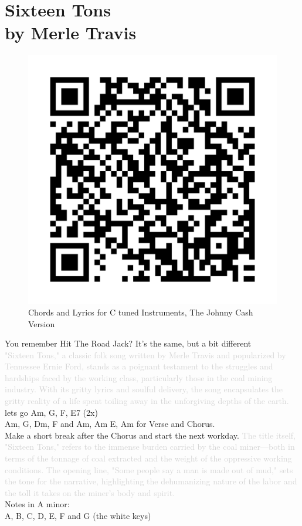 \chapter[Sixteen Tons]{Sixteen Tons\\[1ex]\large{by Merle Travis}}

\begin{figure}
\includegraphics[width=1\linewidth]{QR_Codes/QR_SixteenTons_Chords.png}\\
Chords and Lyrics for C tuned Instruments, The Johnny Cash Version
\end{figure}

You remember Hit The Road Jack? It's the same, but a bit different\\
\textcolor{lightgray}{"Sixteen Tons," a classic folk song written by Merle Travis and popularized by Tennessee Ernie Ford, stands as a poignant testament to the struggles and hardships faced by the working class, particularly those in the coal mining industry. With its gritty lyrics and soulful delivery, the song encapsulates the gritty reality of a life spent toiling away in the unforgiving depths of the earth.}\\ lets go Am, G, F, E7 (2x)\\ Am, G, Dm, F and Am, Am E, Am for Verse and Chorus.\\ Make a short break after the Chorus and start the next workday.
\textcolor{lightgray}{The title itself, "Sixteen Tons," refers to the immense burden carried by the coal miner—both in terms of the tonnage of coal extracted and the weight of the oppressive working conditions. The opening line, "Some people say a man is made out of mud," sets the tone for the narrative, highlighting the dehumanizing nature of the labor and the toll it takes on the miner's body and spirit.}\\

Notes in A minor:\\

A, B, C, D, E, F and G (the white keys)
